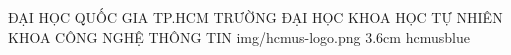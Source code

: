 


\makeuniversitycover
  {ĐẠI HỌC QUỐC GIA TP.HCM}
  {TRƯỜNG ĐẠI HỌC KHOA HỌC TỰ NHIÊN}
  {KHOA CÔNG NGHỆ THÔNG TIN}
  {img/hcmus-logo.png}
  {3.6cm}
  {hcmusblue}
